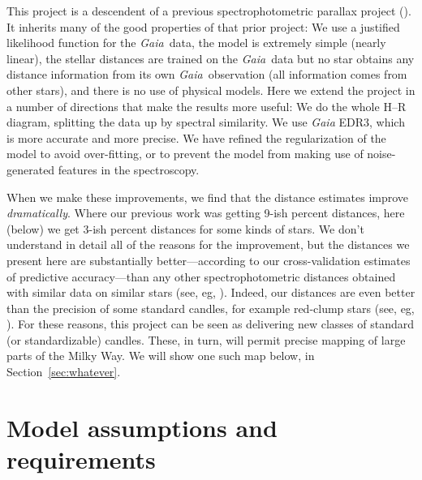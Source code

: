 \documentclass[modern]{aastex631}
\newcommand{\sectionname}{Section}
\newcommand{\acronym}[1]{{\small{#1}}}
\newcommand{\project}[1]{\textsl{#1}}
\newcommand{\Gaia}{\project{Gaia}}
\begin{document}
This project is a descendent of a previous spectrophotometric parallax project
(\citealt{her}).
It inherits many of the good properties of that prior project:
We use a justified likelihood function for the \Gaia\ data,
the model is extremely simple (nearly linear),
the stellar distances are trained on the \Gaia\ data but no star obtains
any distance information from its own \Gaia\ observation (all information
comes from other stars),
and there is no use of physical models.
Here we extend the project in a number of directions that make the results
more useful:
We do the whole H--R diagram, splitting the data up by spectral similarity.
We use \Gaia{} \acronym{EDR3}, which is more accurate and more precise.
We have refined the regularization of the model to avoid over-fitting, or to prevent
the model from making use of noise-generated features in the spectroscopy.

When we make these improvements, we find that the distance estimates improve
\emph{dramatically}.
Where our previous work was getting 9-ish percent distances, here (below) we
get 3-ish percent distances for some kinds of stars.
We don't understand in detail all of the reasons for the improvement, but the
distances we present here are substantially better---according to our
cross-validation estimates of predictive accuracy---than any other spectrophotometric
distances obtained with similar data on similar stars (see, eg, \citealt{foo, bar}).
Indeed, our distances are even better than the precision of some standard candles,
for example red-clump stars (see, eg, \citealt{whatever}).
For these reasons, this project can be seen as delivering new classes of standard
(or standardizable) candles.
These, in turn, will permit precise mapping of large parts of the Milky Way.
We will show one such map below, in \sectionname~\ref{sec:whatever}.

\section{Model assumptions and requirements}\label{sec:assumptions}
\end{document}
